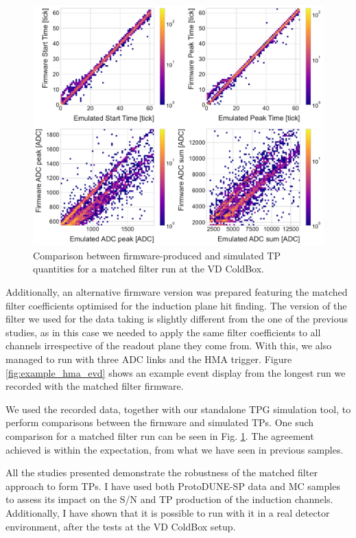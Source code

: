 \begin{figure}[t]
    \centering
    \includegraphics[scale = 0.5]{Images/Matched_Filter/np02_coldbox_tp_comp.pdf}
    \caption[Comparison between firmware-produced and simulated TP quantities for a matched filter run at the VD ColdBox.]{Comparison between firmware-produced and simulated TP quantities for a matched filter run at the VD ColdBox.}
    \label{fig:vdcoldbox_tp_comp}
\end{figure}

Additionally, an alternative firmware version was prepared featuring the matched filter coefficients optimised for the induction plane hit finding. The version of the filter we used for the data taking is slightly different from the one of the previous studies, as in this case we needed to apply the same filter coefficients to all channels irrespective of the readout plane they come from. With this, we also managed to run with three ADC links and the HMA trigger. Figure \ref{fig:example_hma_evd} shows an example event display from the longest run we recorded with the matched filter firmware.

We used the recorded data, together with our standalone TPG simulation tool, to perform comparisons between the firmware and simulated TPs. One such comparison for a matched filter run can be seen in Fig. \ref{fig:vdcoldbox_tp_comp}. The agreement achieved is within the expectation, from what we have seen in previous samples.

All the studies presented demonstrate the robustness of the matched filter approach to form TPs. I have used both ProtoDUNE-SP data and MC samples to assess its impact on the S/N and TP production of the induction channels. Additionally, I have shown that it is possible to run with it in a real detector environment, after the tests at the VD ColdBox setup.


